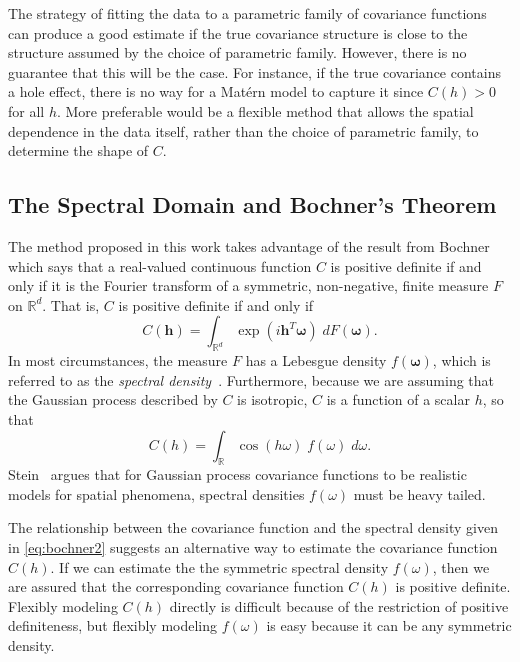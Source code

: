 \documentclass[12pt]{article}
\begin{document}
The strategy of fitting the data to a parametric family of covariance functions can produce a good estimate if the true covariance structure is close to the structure assumed by the choice of parametric family. However, there is no guarantee that this will be the case. For instance, if the true covariance contains a hole effect, there is no way for a Mat\'ern model to capture it since $C(h) > 0$ for all $h$. More preferable would be a flexible method that allows the spatial dependence in the data itself, rather than the choice of parametric family, to determine the shape of $C$.


\subsection{The Spectral Domain and Bochner's Theorem} %
\label{sec:bochner_s_theorem}

The method proposed in this work takes advantage of the result from Bochner~\cite{bochner1955harmonic} which says that a real-valued continuous function $C$ is positive definite if and only if it is the Fourier transform of a symmetric, non-negative, finite measure $F$ on $\mathbb{R}^d$. That is, $C$ is positive definite if and only if
\begin{equation} \label{eq:bochner}
C(\bm{h}) = \int_{\mathbb{R}^d} \exp(i \bm{h}^T \bm{\omega}) \; dF(\bm{\omega}).
\end{equation}
In most circumstances, the measure $F$ has a Lebesgue density $f(\bm{\omega})$, which is referred to as the \emph{spectral density}~\cite{gelfand2010handbook}.  Furthermore, because we are assuming that the Gaussian process described by $C$ is isotropic, $C$ is a function of a scalar $h$, so that
\begin{equation} \label{eq:bochner2}
C(h) = \int_{\mathbb{R}} \cos(h\omega) \; f(\omega) \; d\omega.
\end{equation}
Stein~\cite{Stein1999} argues that for Gaussian process covariance functions to be realistic models for spatial phenomena, spectral densities $f(\omega)$ must be heavy tailed.

The relationship between the covariance function and the spectral density given in \eqref{eq:bochner2} suggests an alternative way to estimate the covariance function $C(h)$. If we can estimate the the symmetric spectral density $f(\omega)$, then we are assured that the corresponding covariance function $C(h)$ is positive definite.  Flexibly modeling $C(h)$ directly is difficult because of the restriction of positive definiteness, but flexibly modeling $f(\omega) $ is easy because it can be any symmetric density.
\end{document}
